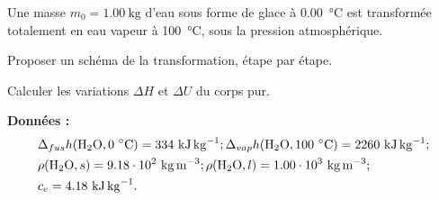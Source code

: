 \begin{exercise}

Une masse $m_0 = 1.00 ~ \si{\kilo\gram}$ d’eau sous forme de glace à \SI{0.00}{\celsius} est transformée totalement en eau vapeur à \SI{100}{\celsius}, sous la pression atmosphérique.

\begin{questions}
\question Proposer un schéma de la transformation, étape par étape.

\question Calculer les variations $\Delta H$ et $\Delta U$ du corps pur.
\end{questions}


\textbf{Données :}
\begin{align*}
& \Delta_{fus} h (\ce{H2O}, 0 ~ \si{\celsius}) = 334 ~ \si{\kilo\joule\per\kilo\gram} ;  \Delta_{vap} h (\ce{H2O}, 100 ~ \si{\celsius}) = 2260 ~ \si{\kilo\joule\per\kilo\gram} ; \\
& \rho(\ce{H2O}, s) = 9.18 \cdot 10^2 ~ \si{\kilo\gram\per\meter\cubed} ; \rho (\ce{H2O}, l) = 1.00\cdot 10^3 ~ \si{\kilo\gram\per\meter\cubed} ; \\
& c_e = 4.18 ~ \si{\kilo\joule\per\kilo\gram}.
\end{align*}

\end{exercise}
